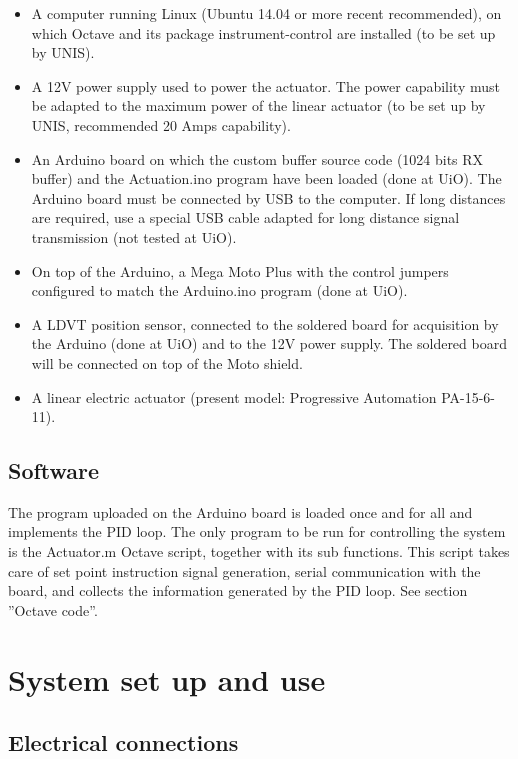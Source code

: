 \documentclass[pdftex,a4paper,12pt,onecolumn,fleqn,captions=tableheading]{scrartcl}
\begin{document}
\begin{itemize}
\item A computer running Linux (Ubuntu 14.04 or more recent recommended), on which Octave and its package instrument-control are installed (to be set up by UNIS).
\item A 12V power supply used to power the actuator. The power capability must be adapted to the maximum power of the linear actuator (to be set up by UNIS, recommended 20 Amps capability).
\item An Arduino board on which the custom buffer source code (1024 bits RX buffer) and the Actuation.ino program have been loaded (done at UiO). The Arduino board must be connected by USB to the computer. If long distances are required, use a special USB cable adapted for long distance signal transmission (not tested at UiO).
\item On top of the Arduino, a Mega Moto Plus with the control jumpers configured to match the Arduino.ino program (done at UiO).
\item A LDVT position sensor, connected to the soldered board for acquisition by the Arduino (done at UiO) and to the 12V power supply. The soldered board will be connected on top of the Moto shield.
\item A linear electric actuator (present model: Progressive Automation PA-15-6-11).
\end{itemize}

\subsection{Software}

The program uploaded on the Arduino board is loaded once and for all and implements the PID loop. The only program to be run for controlling the system is the Actuator.m Octave script, together with its sub functions. This script takes care of set point instruction signal generation, serial communication with the board, and collects the information generated by the PID loop. See section ''Octave code''.

\section{System set up and use}

\subsection{Electrical connections}
\end{document}
